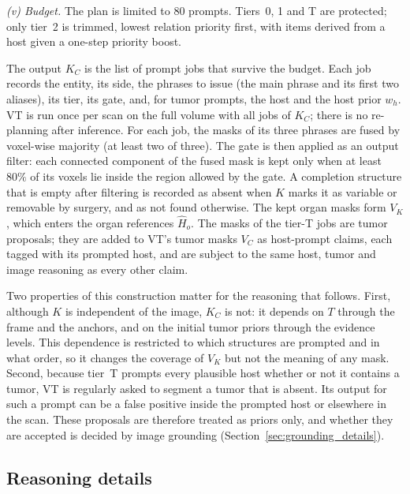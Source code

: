 \documentclass[fleqn,10pt]{olplainarticle}
\begin{document}
\emph{(v) Budget.} The plan is limited to $80$ prompts. Tiers~0, 1 and T are protected; only tier~2 is trimmed, lowest relation
priority first, with items derived from a host given a one-step priority boost.

The output $K_C$ is the list of prompt jobs that survive the budget. Each job records the entity, its side, the phrases to
issue (the main phrase and its first two aliases), its tier, its gate, and, for tumor prompts, the host and the host
prior $w_h$. VT is run once per scan on the full volume with all jobs of $K_C$; there is no re-planning after inference.
For each job, the masks of its three phrases are fused by voxel-wise majority (at least two of three). The gate is then
applied as an output filter: each connected component of the fused mask is kept only when at least $80\%$ of its
voxels lie inside the region allowed by the gate. A completion structure that is empty after filtering is recorded as
absent when $K$ marks it as variable or removable by surgery, and as not found otherwise. The kept organ masks form $V_K$, which enters the organ references
$\hat H_o$. The masks of the tier-T jobs are tumor proposals; they are added to VT's tumor masks $V_C$ as host-prompt
claims, each tagged with its prompted host, and are subject to the same host, tumor and image reasoning as every other claim.

Two properties of this construction matter for the reasoning that follows. First, although $K$ is independent of the
image, $K_C$ is not: it depends on $T$ through the frame and the anchors, and on the initial tumor priors through the
evidence levels. This dependence is restricted to which structures are prompted and in what order, so it changes the
coverage of $V_K$ but not the meaning of any mask. Second, because tier~T prompts every plausible host whether or not it
contains a tumor, VT is regularly asked to segment a tumor that is absent. Its output for such a prompt can be a false
positive inside the prompted host or elsewhere in the scan. These proposals are therefore treated as priors only, and
whether they are accepted is decided by image grounding
(Section~\ref{sec:grounding_details}).

\subsection{Reasoning details}
\label{sec:reasoning_details}
\end{document}

